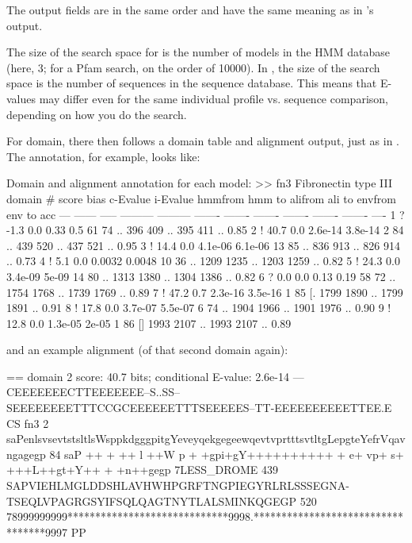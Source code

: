 The output fields are in the same order and have the same meaning as
in 's output. 

The size of the search space for  is the number of
models in the HMM database (here, 3; for a Pfam search, on the order
of 10000). In , the size of the search space is the
number of sequences in the sequence database. This means that E-values
may differ even for the same individual profile vs. sequence
comparison, depending on how you do the search.

For domain, there then follows a domain table and alignment output,
just as in . The  annotation, for example,
looks like:

\begin{sreoutput}
Domain and alignment annotation for each model:
>> fn3  Fibronectin type III domain
   #    score  bias  c-Evalue  i-Evalue hmmfrom  hmm to    alifrom  ali to    envfrom  env to     acc
 ---   ------ ----- --------- --------- ------- -------    ------- -------    ------- -------    ----
   1 ?   -1.3   0.0      0.33       0.5      61      74 ..     396     409 ..     395     411 .. 0.85
   2 !   40.7   0.0   2.6e-14   3.8e-14       2      84 ..     439     520 ..     437     521 .. 0.95
   3 !   14.4   0.0   4.1e-06   6.1e-06      13      85 ..     836     913 ..     826     914 .. 0.73
   4 !    5.1   0.0    0.0032    0.0048      10      36 ..    1209    1235 ..    1203    1259 .. 0.82
   5 !   24.3   0.0   3.4e-09     5e-09      14      80 ..    1313    1380 ..    1304    1386 .. 0.82
   6 ?    0.0   0.0      0.13      0.19      58      72 ..    1754    1768 ..    1739    1769 .. 0.89
   7 !   47.2   0.7   2.3e-16   3.5e-16       1      85 [.    1799    1890 ..    1799    1891 .. 0.91
   8 !   17.8   0.0   3.7e-07   5.5e-07       6      74 ..    1904    1966 ..    1901    1976 .. 0.90
   9 !   12.8   0.0   1.3e-05     2e-05       1      86 []    1993    2107 ..    1993    2107 .. 0.89
\end{sreoutput}

and an example alignment (of that second domain again):

\begin{sreoutput}
  == domain 2    score: 40.7 bits;  conditional E-value: 2.6e-14
                  ---CEEEEEEECTTEEEEEEE--S..SS--SEEEEEEEETTTCCGCEEEEEETTTSEEEEES--TT-EEEEEEEEEETTEE.E CS
          fn3   2 saPenlsvsevtstsltlsWsppkdgggpitgYeveyqekgegeewqevtvprtttsvtltgLepgteYefrVqavngagegp 84 
                  saP   ++ +  ++ l ++W p +  +gpi+gY++++++++++  + e+ vp+   s+ +++L++gt+Y++ +  +n++gegp
  7LESS_DROME 439 SAPVIEHLMGLDDSHLAVHWHPGRFTNGPIEGYRLRLSSSEGNA-TSEQLVPAGRGSYIFSQLQAGTNYTLALSMINKQGEGP 520
                  78999999999*****************************9998.**********************************9997 PP
\end{sreoutput}

